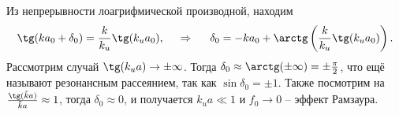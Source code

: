 Из непрерывности лоагрифмической производной, находим
\begin{equation*}
	\tg(k a_0 + \delta_0) = \frac{k}{k_u} \tg(k_u a_0),
	\hspace{0.5cm} \Rightarrow \hspace{0.5cm}
	\delta_0 = - k a_0 + \arctg\left(
		\frac{k}{k_u} \tg(k_u a_0)
	\right).
\end{equation*}
Рассмотрим случай $\tg(k_u a) \to \pm \infty$. Тогда $\delta_0 \approx \arctg(\pm\infty) = \pm\frac{\pi}{2}$, что ещё называют резонансным рассеянием, так как $\sin \delta_0 = \pm 1$.
Также посмотрим на $\frac{\tg(\tilde{k} a)}{\tilde{k} a} \approx	1$, тогда $\delta_0 \approx	0$, и получается $k_u a \ll 1$ и $f_0 \to 0$ -- эффект Рамзаура.

